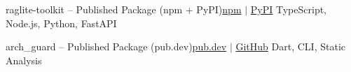 \documentclass[a4paper,10pt]{article}
\begin{document}
    \resumeSubheading
      {raglite-toolkit -- Published Package (npm + PyPI)}{\href{https://www.npmjs.com/package/raglite-toolkit}{npm} $|$ \href{https://pypi.org/project/raglite-toolkit/}{PyPI}}
      {TypeScript, Node.js, Python, FastAPI}{}
      \resumeItemListStart
      \resumeItemListEnd

    \resumeSubheading
      {arch\_guard -- Published Package (pub.dev)}{\href{https://pub.dev/packages/arch_guard}{pub.dev} $|$ \href{https://github.com/creatorpiyush/arch_guard}{GitHub}}
      {Dart, CLI, Static Analysis}{}
      \resumeItemListStart
      \resumeItemListEnd

  \resumeSubHeadingListEnd


\end{document}

